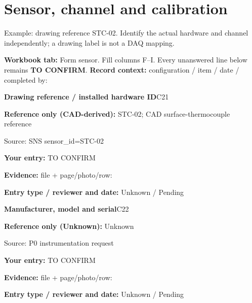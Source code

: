 \documentclass[11pt]{article}
\begin{document}
\clearpage\section{Sensor, channel and calibration}\label{form-sensor}
Example: drawing reference STC-02. Identify the actual hardware and channel independently; a drawing label is not a DAQ mapping.
\par\textbf{Workbook tab:} Form sensor. Fill columns F--I. Every unanswered line below remains \textbf{TO CONFIRM}.
\textbf{Record context:} configuration / item / date / completed by: \hrulefill\par
\begin{minipage}{\textwidth}\small
{\color{navy}\bfseries Drawing reference / installed hardware ID}\hfill C21\par
\colorbox{pale}{\parbox{\dimexpr\linewidth-2\fboxsep\relax}{
\textbf{Reference only (CAD-derived):} STC-02; CAD surface-thermocouple reference\par
{\footnotesize Source: SNS sensor\_\allowbreak{}id=STC-02}}}\par
\textbf{Your entry:} {\color{muted}TO CONFIRM}\enspace\hrulefill\par
{\footnotesize\textbf{Evidence:} file + page/photo/row: \hrulefill\par
\textbf{Entry type / reviewer and date:} Unknown / Pending\par
}\end{minipage}\par\vspace{5pt}
\begin{minipage}{\textwidth}\small
{\color{navy}\bfseries Manufacturer, model and serial}\hfill C22\par
\colorbox{pale}{\parbox{\dimexpr\linewidth-2\fboxsep\relax}{
\textbf{Reference only (Unknown):} Unknown\par
{\footnotesize Source: P0 instrumentation request}}}\par
\textbf{Your entry:} {\color{muted}TO CONFIRM}\enspace\hrulefill\par
{\footnotesize\textbf{Evidence:} file + page/photo/row: \hrulefill\par
\textbf{Entry type / reviewer and date:} Unknown / Pending\par
}\end{minipage}\par\vspace{5pt}
\end{document}

